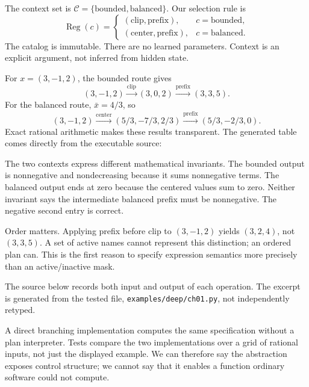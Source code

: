 The context set is $\mathcal C=\{\text{bounded},\text{balanced}\}$. Our selection rule is
\[
 \operatorname{Reg}(c)=
 \begin{cases}
  (\text{clip},\text{prefix}),&c=\text{bounded},\\
  (\text{center},\text{prefix}),&c=\text{balanced}.
 \end{cases}
\]
The catalog is immutable. There are no learned parameters. Context is an explicit argument, not inferred from hidden state.

For $x=(3,-1,2)$, the bounded route gives
\[
 (3,-1,2)\xrightarrow{\mathrm{clip}}(3,0,2)
 \xrightarrow{\mathrm{prefix}}(3,3,5).
\]
For the balanced route, $\bar x=4/3$, so
\[
 (3,-1,2)\xrightarrow{\mathrm{center}}
 (5/3,-7/3,2/3)\xrightarrow{\mathrm{prefix}}(5/3,-2/3,0).
\]
Exact rational arithmetic makes these results transparent. The generated table comes directly from the executable source:
\begin{center}\end{center}

The two contexts express different mathematical invariants. The bounded output is nonnegative and nondecreasing because it sums nonnegative terms. The balanced output ends at zero because the centered values sum to zero. Neither invariant says the intermediate balanced prefix must be nonnegative. The negative second entry is correct.

Order matters. Applying prefix before clip to $(3,-1,2)$ yields $(3,2,4)$, not $(3,3,5)$. A set of active names cannot represent this distinction; an ordered plan can. This is the first reason to specify expression semantics more precisely than an active/inactive mask.

The source below records both input and output of each operation. The excerpt is generated from the tested file, \texttt{examples/deep/ch01.py}, not independently retyped.

A direct branching implementation computes the same specification without a plan interpreter. Tests compare the two implementations over a grid of rational inputs, not just the displayed example. We can therefore say the abstraction exposes control structure; we cannot say that it enables a function ordinary software could not compute.

